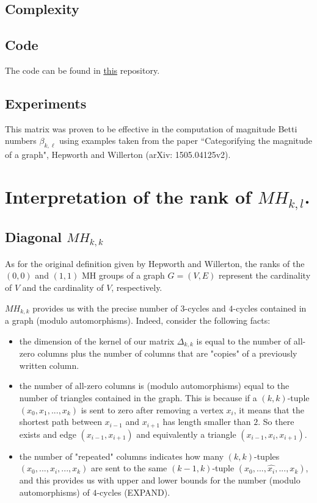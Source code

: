 \documentclass{article}
\begin{document}
	\subsection{Complexity}
	
	\subsection{Code}
	The code can be found in \href{https://github.com/GMenara/magnitude-homology-calculations}{this} repository. 
	
	\subsection{Experiments}
	This matrix was proven to be effective in the computation of magnitude Betti numbers $\beta_{k,\ell}$ using examples taken from the paper ``Categorifying the magnitude of a graph", Hepworth and Willerton (arXiv: 1505.04125v2).  
	
	\section{Interpretation of the rank of $MH_{k,l}$.}
	
	\subsection{Diagonal $MH_{k,k}$}
	As for the original definition given by Hepworth and Willerton, the ranks of the $(0,0)$ and $(1,1)$ MH groups of a graph $G=(V,E)$ represent the cardinality of $V$ and the cardinality of $V$, respectively. 
	\medskip
	
	$MH_{k,k}$ provides us with the precise number of $3$-cycles and $4$-cycles contained in a graph (modulo automorphisms). Indeed, consider the following facts:
	\begin{itemize}
		\item the dimension of the kernel of our matrix $\Delta_{k,k}$ is equal to the number of all-zero columns plus the number of columns that are "copies" of a previously written column.
		\item the number of all-zero columns is (modulo automorphisms) equal to the number of triangles contained in the graph. This is because if a $(k,k)$-tuple $(x_0,x_1,...,x_k)$ is sent to zero after removing a vertex $x_i$, it means that the shortest path between $x_{i-1}$ and $x_{i+1}$ has length smaller than $2$. So there exists and edge $(x_{i-1},x_{i+1})$ and equivalently a triangle $(x_{i-1},x_i,x_{i+1})$.
		\item the number of "repeated" columns indicates how many $(k,k)$-tuples $(x_0,...,x_i,...,x_k)$ are sent to the same $(k-1,k)$-tuple $(x_0,...,\hat{x_i},...,x_k)$, and this provides us with upper and lower bounds for the number (modulo automorphisms) of $4$-cycles (EXPAND).
	\end{itemize}
	
\end{document}
